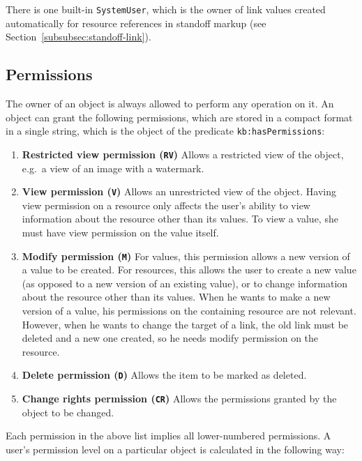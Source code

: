\documentclass[12pt, a4paper]{article}
\begin{document}
There is one built-in \texttt{SystemUser}, which is the owner of link values created automatically for resource references in standoff markup (see Section~\ref{subsubsec:standoff-link}).

\subsection{Permissions}

The owner of an object is always allowed to perform any operation on it. An object can grant the following permissions, which are stored in a compact format in a single string, which is the object of the predicate 
\texttt{kb:hasPermissions}:

\begin{enumerate}
	\item \textbf{Restricted view permission (\texttt{RV})} Allows a restricted view of the object, e.g.\ a view of an image with a watermark.
	\item \textbf{View permission (\texttt{V})} Allows an unrestricted view of the object. Having view permission on a resource only affects the user's ability to view information about the resource other than its values. To view a value, she must have view permission on the value itself.
	\item \textbf{Modify permission (\texttt{M})} For values, this permission allows a new version of a value to be created. For resources, this allows the user to create a new value (as opposed to a new version of an existing value), or to change information about the resource other than its values. When he wants to make a new version of a value, his permissions on the containing resource are not relevant. However, when he wants to change the target of a link, the old link must be deleted and a new one created, so he needs modify permission on the resource.
	\item \textbf{Delete permission (\texttt{D})} Allows the item to be marked as deleted.
	\item \textbf{Change rights permission (\texttt{CR})} Allows the permissions granted by the object to be changed.
\end{enumerate}

Each permission in the above list implies all lower-numbered permissions. A user's permission level on a particular object is calculated in the following way:
\end{document}
